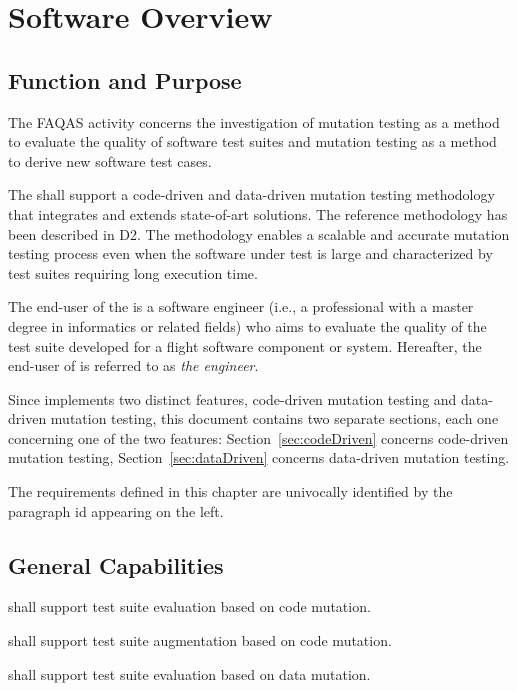 
\chapter{Software Overview}
\label{chapter:overview}

\section{Function and Purpose}

The FAQAS activity concerns the investigation of mutation testing as a method to evaluate the quality of software test suites and mutation testing as a method to derive new software test cases.

The \FAQAS shall support a code-driven and data-driven mutation testing methodology that integrates and extends state-of-art solutions. The reference methodology has been described in D2. The methodology enables a scalable and accurate mutation testing process even when the software under test is large and characterized by test suites requiring long execution time.

The end-user of the \FAQAS is a software engineer (i.e., a professional with a master degree in informatics or related fields)  who aims to evaluate the quality of the test suite developed for a flight software component or system. Hereafter, the end-user of \FAQAS is referred to as \emph{the engineer}.

Since \FAQAS implements two distinct features, code-driven mutation testing and data-driven mutation testing, this document contains two separate sections, each one concerning one of the two features: Section~\ref{sec:codeDriven} concerns code-driven mutation testing, Section~\ref{sec:dataDriven} concerns data-driven mutation testing.

The requirements defined in this chapter are univocally identified by the paragraph id appearing on the left.

\section{General Capabilities}

\RQ{} \FAQAS shall support test suite evaluation based on code mutation.

\RQ{} \FAQAS shall support test suite augmentation based on code mutation.

\RQ{} \FAQAS shall support test suite evaluation based on data mutation.

